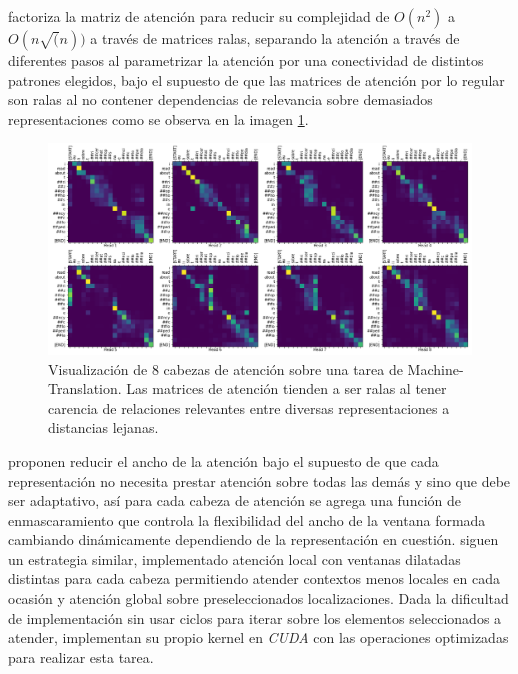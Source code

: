 \citeauthor*{DBLP:journals/corr/abs-1904-10509} factoriza la matriz de atención para reducir su complejidad
de $O(n^2)$ a $O(n\sqrt(n))$ a través de matrices ralas, separando la atención a través de diferentes
pasos al parametrizar la atención por una conectividad de distintos patrones elegidos, bajo el supuesto
de que las matrices de atención por lo regular son ralas al no contener dependencias de relevancia
sobre demasiados representaciones como se observa en la imagen \ref{fig:att-spar}.

\begin{figure}[ht!]
    \centering
    \includegraphics[width=0.7 \textwidth]{Chapters/1. Transformer/Figures/transformer/head_sparsity.png}
    \caption{Visualización de 8 cabezas de atención sobre una tarea de Machine-Translation. Las
    matrices de atención tienden a ser ralas al tener carencia de relaciones relevantes entre diversas
    representaciones a distancias lejanas.}
    \label{fig:att-spar}
\end{figure}

\citeauthor*{DBLP:journals/corr/abs-1905-07799} proponen reducir el ancho de la atención bajo el supuesto
de que cada representación no necesita prestar atención sobre todas las demás y sino que debe ser
adaptativo, así para cada cabeza de atención se agrega una función de enmascaramiento que controla
la flexibilidad del ancho de la ventana formada cambiando dinámicamente dependiendo de la representación
en cuestión. \citeauthor*{DBLP:journals/corr/abs-2004-05150} siguen un estrategia similar, implementado
atención local con ventanas dilatadas distintas para cada cabeza permitiendo atender contextos menos
locales en cada ocasión y atención global sobre preseleccionados localizaciones. Dada la dificultad de
implementación sin usar ciclos para iterar sobre los elementos seleccionados a atender, implementan
su propio kernel en \textit{CUDA} con las operaciones optimizadas para realizar esta tarea.

